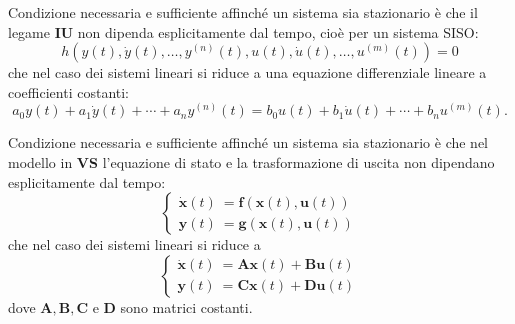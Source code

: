 \documentclass[a4paper]{article}
\renewcommand{\vec}{\bm}
\theoremstyle{definition}
\begin{document}
		Condizione necessaria e sufficiente affinché un sistema sia stazionario è che il legame \textbf{IU} non dipenda esplicitamente dal tempo, cioè per un sistema SISO:
		\[
			h \left( y(t), \dot{y}(t), \dots, y^{(n)}(t), u(t), \dot{u}(t),\dots, u^{(m)}(t) \right) = 0
		\]
		che nel caso dei sistemi lineari si riduce a una equazione differenziale lineare a
		coefficienti costanti:
		\[
			a_0 y(t) + a_1\dot{y}(t) + \cdots + a_n y^{(n)}(t) = 
			b_0 u(t) + b_1\dot{u}(t) + \cdots + b_n u^{(m)}(t).
		\]
		
		Condizione necessaria e sufficiente affinché un	sistema sia stazionario è che nel modello in \textbf{VS} l’equazione di stato e la trasformazione di uscita non dipendano esplicitamente dal tempo:
		\[
			\begin{cases}
				\vec{\dot{x}}(t)\ =\vec{f}(\vec{x}(t),\vec{u}(t)) \\
				\vec{y}(t)\ =\vec{g}(\vec{x}(t),\vec{u}(t)) 
			\end{cases}
		\]
		che nel caso dei sistemi lineari si riduce a
		\[
			\begin{cases}
				\vec{\dot{x}}(t)\ =\vec{A}\vec{x}(t)+ \vec{B}\vec{u}(t)  \\
				\vec{y}(t)\ =\vec{C}\vec{x}(t)+ \vec{D}\vec{u}(t) 
			\end{cases}
		\]
		dove $ \vec{A}, \vec{B}, \vec{C} $ e $ \vec{D} $ sono matrici costanti.
\end{document}
